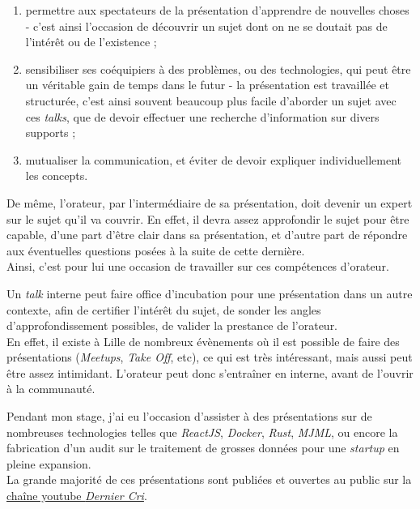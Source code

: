 \begin{enumerate}
\def\labelenumi{\arabic{enumi}.}
\tightlist
\item
  permettre aux spectateurs de la présentation d'apprendre de nouvelles
  choses - c'est ainsi l'occasion de découvrir un sujet dont on ne se
  doutait pas de l'intérêt ou de l'existence ;\\
\item
  sensibiliser ses coéquipiers à des problèmes, ou des technologies, qui
  peut être un véritable gain de temps dans le futur - la présentation
  est travaillée et structurée, c'est ainsi souvent beaucoup plus facile
  d'aborder un sujet avec ces \emph{talks}, que de devoir effectuer une
  recherche d'information sur divers supports ;\\
\item
  mutualiser la communication, et éviter de devoir expliquer
  individuellement les concepts.
\end{enumerate}

\bigskip

De même, l'orateur, par l'intermédiaire de sa présentation, doit devenir
un expert sur le sujet qu'il va couvrir. En effet, il devra assez
approfondir le sujet pour être capable, d'une part d'être clair dans sa
présentation, et d'autre part de répondre aux éventuelles questions
posées à la suite de cette dernière.\\
Ainsi, c'est pour lui une occasion de travailler sur ces compétences
d'orateur.

\bigskip

Un \emph{talk} interne peut faire office d'incubation pour une
présentation dans un autre contexte, afin de certifier l'intérêt du
sujet, de sonder les angles d'approfondissement possibles, de valider la
prestance de l'orateur.\\
En effet, il existe à Lille de nombreux évènements où il est possible de
faire des présentations (\emph{Meetups}, \emph{Take Off}, etc), ce qui
est très intéressant, mais aussi peut être assez intimidant. L'orateur
peut donc s'entraîner en interne, avant de l'ouvrir à la communauté.

\bigskip

Pendant mon stage, j'ai eu l'occasion d'assister à des présentations sur
de nombreuses technologies telles que \emph{ReactJS}, \emph{Docker},
\emph{Rust}, \emph{MJML}, ou encore la fabrication d'un audit sur le
traitement de grosses données pour une \emph{startup} en pleine
expansion.\\
La grande majorité de ces présentations sont publiées et ouvertes au
public sur la
\href{https://www.youtube.com/channel/UCDfdBlzldhg_PEu3xZTPsHg}{chaîne
youtube \emph{Dernier Cri}}.

